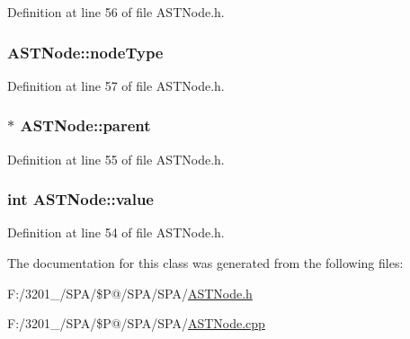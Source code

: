 Definition at line 56 of file A\-S\-T\-Node.\-h.

\hypertarget{class_a_s_t_node_a15fcdbd8403a1169b06d948a827fde55}{
\subsubsection[{node\-Type}]{ A\-S\-T\-Node\-::node\-Type\hspace{0.3cm}{\ttfamily [protected]}}}\label{class_a_s_t_node_a15fcdbd8403a1169b06d948a827fde55}


Definition at line 57 of file A\-S\-T\-Node.\-h.

\hypertarget{class_a_s_t_node_aaa1e479bfeb485d93a4866f9c2daf171}{
\subsubsection[{parent}]{$\ast$ A\-S\-T\-Node\-::parent\hspace{0.3cm}{\ttfamily [protected]}}}\label{class_a_s_t_node_aaa1e479bfeb485d93a4866f9c2daf171}


Definition at line 55 of file A\-S\-T\-Node.\-h.

\hypertarget{class_a_s_t_node_a136d1712e8cfdeb4908aceb22abc3de7}{
\subsubsection[{value}]{\setlength{\rightskip}{0pt plus 5cm}int A\-S\-T\-Node\-::value\hspace{0.3cm}{\ttfamily [protected]}}}\label{class_a_s_t_node_a136d1712e8cfdeb4908aceb22abc3de7}


Definition at line 54 of file A\-S\-T\-Node.\-h.



The documentation for this class was generated from the following files\-:\begin{DoxyCompactItemize}
\item 
F\-:/3201\-\_/\-S\-P\-A/\$\-P@/\-S\-P\-A/\-S\-P\-A/\hyperlink{_a_s_t_node_8h}{A\-S\-T\-Node.\-h}\item 
F\-:/3201\-\_/\-S\-P\-A/\$\-P@/\-S\-P\-A/\-S\-P\-A/\hyperlink{_a_s_t_node_8cpp}{A\-S\-T\-Node.\-cpp}\end{DoxyCompactItemize}
